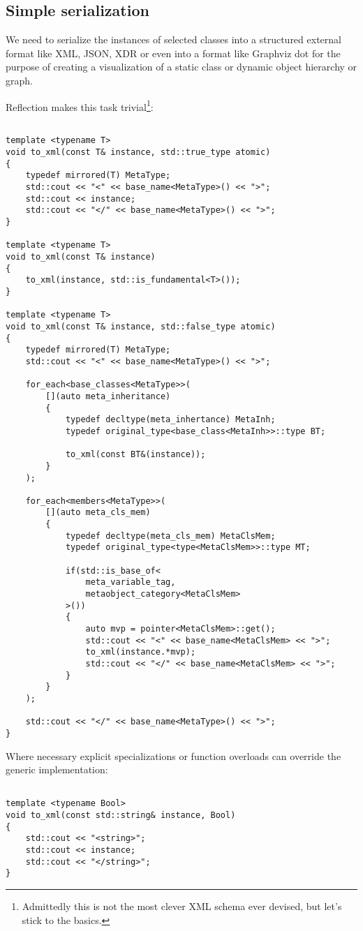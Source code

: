 \subsection{Simple serialization}

We need to serialize the instances of selected classes into a structured external format
like XML, JSON, XDR or even into a format like Graphviz dot for the purpose of creating
a visualization of a static class or dynamic object hierarchy or graph.

Reflection makes this task trivial\footnote{
Admittedly this is not the most clever XML schema ever devised, but let's stick to the basics.}:

\begin{verbatim}

template <typename T>
void to_xml(const T& instance, std::true_type atomic)
{
	typedef mirrored(T) MetaType;
	std::cout << "<" << base_name<MetaType>() << ">";
	std::cout << instance;
	std::cout << "</" << base_name<MetaType>() << ">";
}

template <typename T>
void to_xml(const T& instance)
{
	to_xml(instance, std::is_fundamental<T>());
}

template <typename T>
void to_xml(const T& instance, std::false_type atomic)
{
	typedef mirrored(T) MetaType;
	std::cout << "<" << base_name<MetaType>() << ">";

	for_each<base_classes<MetaType>>(
		[](auto meta_inheritance)
		{
			typedef decltype(meta_inhertance) MetaInh;
			typedef original_type<base_class<MetaInh>>::type BT;

			to_xml(const BT&(instance));
		}
	);

	for_each<members<MetaType>>(
		[](auto meta_cls_mem)
		{
			typedef decltype(meta_cls_mem) MetaClsMem;
			typedef original_type<type<MetaClsMem>>::type MT;

			if(std::is_base_of<
				meta_variable_tag,
				metaobject_category<MetaClsMem>
			>())
			{
				auto mvp = pointer<MetaClsMem>::get();
				std::cout << "<" << base_name<MetaClsMem> << ">";
				to_xml(instance.*mvp);
				std::cout << "</" << base_name<MetaClsMem> << ">";
			}
		}
	);

	std::cout << "</" << base_name<MetaType>() << ">";
}

\end{verbatim}

Where necessary explicit specializations or function overloads can override the generic implementation:

\begin{verbatim}

template <typename Bool>
void to_xml(const std::string& instance, Bool)
{
	std::cout << "<string>";
	std::cout << instance;
	std::cout << "</string>";
}

\end{verbatim}

